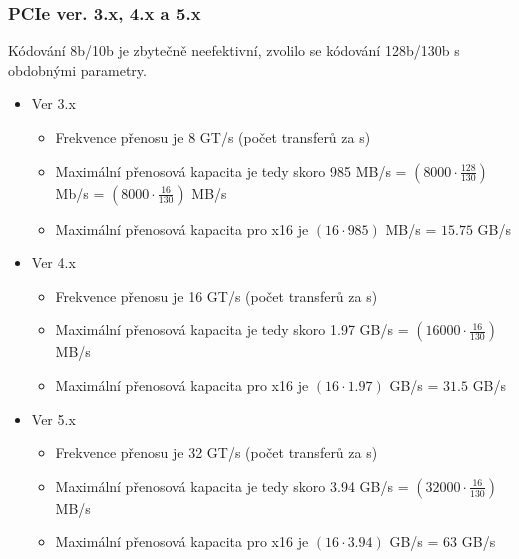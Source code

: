 \documentclass{beamer}
\begin{document}
\begin{frame}
\frametitle{PCIe ver. 3.x, 4.x a 5.x}

Kódování 8b/10b je zbytečně neefektivní, zvolilo se kódování 128b/130b s obdobnými parametry.
\begin{itemize}
\item Ver 3.x 
\begin{itemize}
\item Frekvence přenosu je 8 GT/s (počet transferů za s)
\item Maximální přenosová kapacita je tedy skoro 985 MB/s = $(8000 \cdot \frac{128}{130})$ Mb/s = $(8000 \cdot \frac{16}{130})$ MB/s
\item Maximální přenosová kapacita pro x16 je $(16 \cdot 985)$ MB/s = $15.75$ GB/s
\end{itemize}
\item Ver 4.x 
\begin{itemize}
\item Frekvence přenosu je 16 GT/s (počet transferů za s)
\item Maximální přenosová kapacita je tedy skoro 1.97 GB/s = $(16000 \cdot \frac{16}{130})$ MB/s
\item Maximální přenosová kapacita pro x16 je $(16 \cdot 1.97)$ GB/s = $31.5$ GB/s
\end{itemize}
\item Ver 5.x 
\begin{itemize}
\item Frekvence přenosu je 32 GT/s (počet transferů za s)
\item Maximální přenosová kapacita je tedy skoro 3.94 GB/s = $(32000 \cdot \frac{16}{130})$ MB/s
\item Maximální přenosová kapacita pro x16 je $(16 \cdot 3.94)$ GB/s = $63$ GB/s
\end{itemize}
\end{itemize}

\end{frame}
\end{document}
